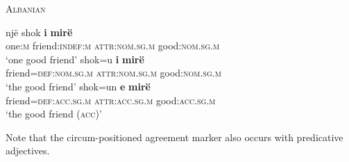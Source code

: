 \begin{exe}
\ex \textsc{Albanian} \citep[166–167]{himmelmann1997} \label{albanian ex}
\begin{xlist}
\ex
\gll	nj\"e	shok 	\textbf{i}	\textbf{mir\"e}\\
	one:\textsc{m}	friend:\textsc{indef:m} 	\textsc{attr:nom.sg.m}	good:\textsc{nom.sg.m}\\
\glt	‘one good friend’
\ex	
\gll	shok=u			\textbf{i}			\textbf{mir\"e}\\
	friend=\textsc{def:nom.sg.m} 	\textsc{attr:nom.sg.m} 	good:\textsc{nom.sg.m}\\
\glt	‘the good friend’
\ex
\gll	shok=un					\textbf{e}			\textbf{mir\"e}\\
	friend=\textsc{def:acc.sg.m} 	\textsc{attr:acc.sg.m} 	good:\textsc{acc.sg.m}\\
\glt	‘the good friend (\textsc{acc})’
\end{xlist}
\end{exe}
Note that the circum-positioned agreement marker also occurs with predicative adjectives. 

